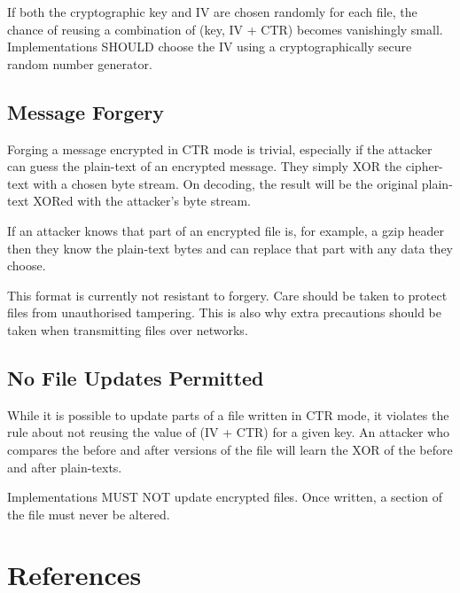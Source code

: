 \documentclass[10pt]{article}
\begin{document}
If both the cryptographic key and IV are chosen randomly for each file, the chance of reusing a combination of
(key, IV + CTR) becomes vanishingly small.
Implementations SHOULD choose the IV using a cryptographically secure random number generator.

\subsection{Message Forgery}
Forging a message encrypted in CTR mode is trivial, especially if the attacker can guess the plain-text of an encrypted
message.
They simply XOR the cipher-text with a chosen byte stream.
On decoding, the result will be the original plain-text XORed with the attacker's byte stream.

If an attacker knows that part of an encrypted file is, for example, a gzip header then they know the plain-text bytes
and can replace that part with any data they choose.

This format is currently not resistant to forgery.
Care should be taken to protect files from unauthorised tampering.
This is also why extra precautions should be taken when transmitting files over networks.

\subsection{No File Updates Permitted}
While it is possible to update parts of a file written in CTR mode, it violates the rule about not reusing the value
of (IV + CTR) for a given key.
An attacker who compares the before and after versions of the file will learn the XOR of the before and after
plain-texts.

Implementations MUST NOT update encrypted files.
Once written, a section of the file must never be altered.

\section{References}
\end{document}
